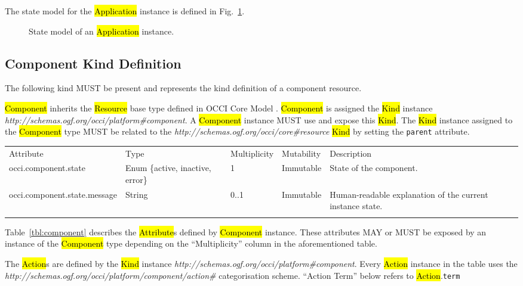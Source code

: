 \documentclass[10pt,a4paper]{article}
\begin{document}
The state model for the \hl{Application} instance is defined in Fig.~\ref{fig:app_state}.

\begin{figure}[!h]
	{\centering {} \par}
	\caption{State model of an \hl{Application} instance.}
	\label{fig:app_state}
\end{figure}

\subsection{Component Kind Definition}
The following kind MUST be present and represents the kind definition of a component resource.

\hl{Component} inherits the \hl{Resource} base type defined in OCCI Core Model \cite{occi:core}. \hl{Component} is assigned the \hl{Kind} instance \textit{http://schemas.ogf.org/occi/platform\#component}. A \hl{Component} instance MUST use and expose this \hl{Kind}. The \hl{Kind} instance assigned to the \hl{Component} type MUST be related to the \textit{http://schemas.ogf.org/occi/core\#resource} \hl{Kind} by setting the \texttt{parent} attribute.

{
	\begin{tabular}{lp{2.5cm}p{1cm}lp{5cm}}
	\toprule
	Attribute&Type&Multi\-plicity&Mutability&Description\\
	\colrule
	occi.component.state & Enum \{active, inactive, error\} & 1 & Immutable & State of the component.\\
	occi.component.state.message & String & 0..1 & Immutable & Human-readable explanation of the current instance state.\\
	\botrule
	\end{tabular}
}

Table~\ref{tbl:component} describes the \hl{Attribute}s defined by \hl{Component} instance. These attributes MAY or MUST be exposed by an instance of the \hl{Component} type depending on the ``Multiplicity'' column in the aforementioned table.

The \hl{Action}s are defined by the \hl{Kind} instance \textit{http://schemas.ogf.org/occi/platform\#component}. Every \hl{Action} instance in the table uses the \textit{http://schemas.ogf.org/occi/platform/component/action\#} categorisation scheme. ``Action Term'' below refers to \hl{Action}.{\tt term}
\end{document}
